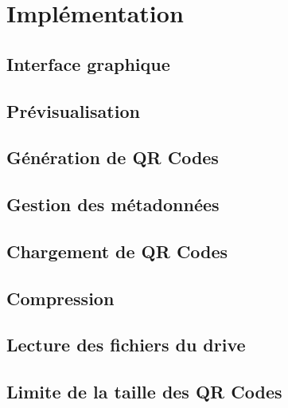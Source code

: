 \documentclass{report}
\begin{document}
		
	\section{Implémentation}
		
		\subsection{Interface graphique}
			
			
		\subsection{Prévisualisation}
			
			
		\subsection{Génération de QR Codes}
			
			
		\subsection{Gestion des métadonnées}
			
			
		\subsection{Chargement de QR Codes}
			
			
		\subsection{Compression}
			
			
		\subsection{Lecture des fichiers du drive}
			
			
		\subsection{Limite de la taille des QR Codes}
			
\end{document}
